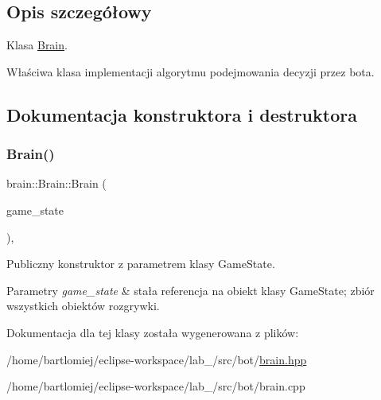 \subsection{Opis szczegółowy}
Klasa \hyperlink{classbrain_1_1Brain}{Brain}. 

Właściwa klasa implementacji algorytmu podejmowania decyzji przez bota. 

\subsection{Dokumentacja konstruktora i destruktora}
\mbox{\label{classbrain_1_1Brain_a5efd1dd47e7690151af7d6cd68ebc05f}} 
\subsubsection{\texorpdfstring{Brain()}{Brain()}}
{\footnotesize\ttfamily brain\+::\+Brain\+::\+Brain (\begin{DoxyParamCaption}\item[{const \hyperlink{structmodel_1_1GameState}{model\+::\+Game\+State} \&}]{game\+\_\+state }\end{DoxyParamCaption})\hspace{0.3cm}{\ttfamily [inline]}, {\ttfamily [explicit]}}



Publiczny konstruktor z parametrem klasy Game\+State. 


\begin{DoxyParams}{Parametry}
{\em game\+\_\+state} & stała referencja na obiekt klasy Game\+State; zbiór wszystkich obiektów rozgrywki. \\
\hline
\end{DoxyParams}


Dokumentacja dla tej klasy została wygenerowana z plików\+:\begin{DoxyCompactItemize}
\item 
/home/bartlomiej/eclipse-\/workspace/lab\+\_/src/bot/\hyperlink{brain_8hpp}{brain.\+hpp}\item 
/home/bartlomiej/eclipse-\/workspace/lab\+\_/src/bot/brain.\+cpp\end{DoxyCompactItemize}
